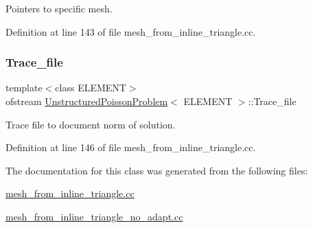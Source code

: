 Pointers to specific mesh. 



Definition at line 143 of file mesh\+\_\+from\+\_\+inline\+\_\+triangle.\+cc.

\mbox{\label{classUnstructuredPoissonProblem_ac7fdb8fb9a886ced0ee7244890406d90}} 
\subsubsection{\texorpdfstring{Trace\+\_\+file}{Trace\_file}}
{\footnotesize\ttfamily template$<$class E\+L\+E\+M\+E\+NT$>$ \\
ofstream \hyperlink{classUnstructuredPoissonProblem}{Unstructured\+Poisson\+Problem}$<$ E\+L\+E\+M\+E\+NT $>$\+::Trace\+\_\+file\hspace{0.3cm}{\ttfamily [private]}}



Trace file to document norm of solution. 



Definition at line 146 of file mesh\+\_\+from\+\_\+inline\+\_\+triangle.\+cc.



The documentation for this class was generated from the following files\+:\begin{DoxyCompactItemize}
\item 
\hyperlink{mesh__from__inline__triangle_8cc}{mesh\+\_\+from\+\_\+inline\+\_\+triangle.\+cc}\item 
\hyperlink{mesh__from__inline__triangle__no__adapt_8cc}{mesh\+\_\+from\+\_\+inline\+\_\+triangle\+\_\+no\+\_\+adapt.\+cc}\end{DoxyCompactItemize}

